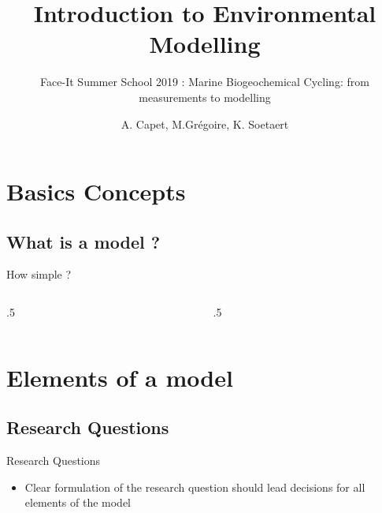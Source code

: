 \documentclass[final,xcolor=dvipsnames]{beamer}
\title[Introduction to Environmental Modelling]{Introduction to Environmental Modelling}
\subtitle{Face-It Summer School 2019 : Marine Biogeochemical Cycling: from measurements to modelling}
\author[A. Capet]{A. Capet, M.Grégoire, K. Soetaert} %
\institute[http://labos.ulg.ac.be/mast/]{MAST - acapet@ulg.ac.be}
\date[Oct 2019]
\begin{document}
\def\mussel{\PHoxBack}
\def\extitle[#1]{\centering{ \mussel \hspace{2cm} #1 \hspace{2cm} \mussel}}

\begin{frame}
  \titlepage
\end{frame}


\section{Basics Concepts}
\subsection{What is a model ?}
\begin{frame}
\end{frame}

\begin{frame}{How simple ?}
\begin{columns}
\begin{column}{.5\framewidth}
\end{column}
\begin{column}{.5\framewidth}
\end{column}
\end{columns}
\end{frame}


\section{Elements of a model}
\subsection{Research Questions}

\begin{frame}
\begin{block}{Research Questions}
\begin{itemize}
    \item Clear formulation of the research question should lead decisions for all elements of the model 
\end{itemize}
\end{block}
\end{frame}
\end{document}
